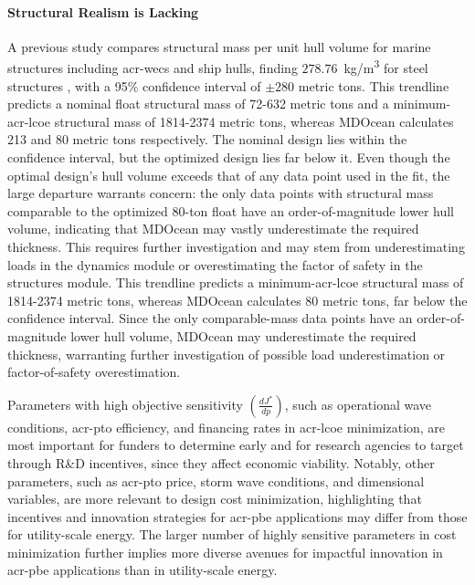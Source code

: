 \paragraph{Structural Realism is Lacking}
A previous study compares structural mass per unit hull volume for marine structures including \glspl{acr-wec} and ship hulls, finding $278.76$~kg/m\textsuperscript{3} for steel structures \citep{roberts_bringing_2021}, with a 95\% confidence interval of $\pm280$ metric tons.
\ifdefined\DISSERTATION
    This trendline predicts a nominal float structural mass of 72-632 metric tons and a minimum-\gls{acr-lcoe} structural mass of 1814-2374 metric tons, whereas MDOcean calculates 213 and 80 metric tons respectively.
    The nominal design lies within the confidence interval, but the optimized design lies far below it.
    Even though the optimal design's hull volume exceeds that of any data point used in the fit, the large departure warrants concern: the only data points with structural mass comparable to the optimized 80-ton float have an order-of-magnitude lower hull volume, indicating that MDOcean may vastly underestimate the required thickness.
    This requires further investigation and may stem from underestimating loads in the dynamics module or overestimating the factor of safety in the structures module.
\else
    This trendline predicts a minimum-\gls{acr-lcoe} structural mass of 1814-2374 metric tons, whereas MDOcean calculates 80 metric tons, far below the confidence interval.
    Since the only comparable-mass data points have an order-of-magnitude lower hull volume, MDOcean may underestimate the required thickness, warranting further investigation of possible load underestimation or factor-of-safety overestimation.
\fi

\ifdefined\DISSERTATION
    Parameters with high objective sensitivity $\left(\frac{dJ^*}{dp}\right)$, such as operational wave conditions, \gls{acr-pto} efficiency, and financing rates in \gls{acr-lcoe} minimization, are most important for funders to determine early and for research agencies to target through R\&D incentives, since they affect economic viability.
    Notably, other parameters, such as \gls{acr-pto} price, storm wave conditions, and dimensional variables, are more relevant to design cost minimization, highlighting that incentives and innovation strategies for \gls{acr-pbe} applications may differ from those for utility-scale energy.
    The larger number of highly sensitive parameters in cost minimization further implies more diverse avenues for impactful innovation in \gls{acr-pbe} applications than in utility-scale energy.
    
